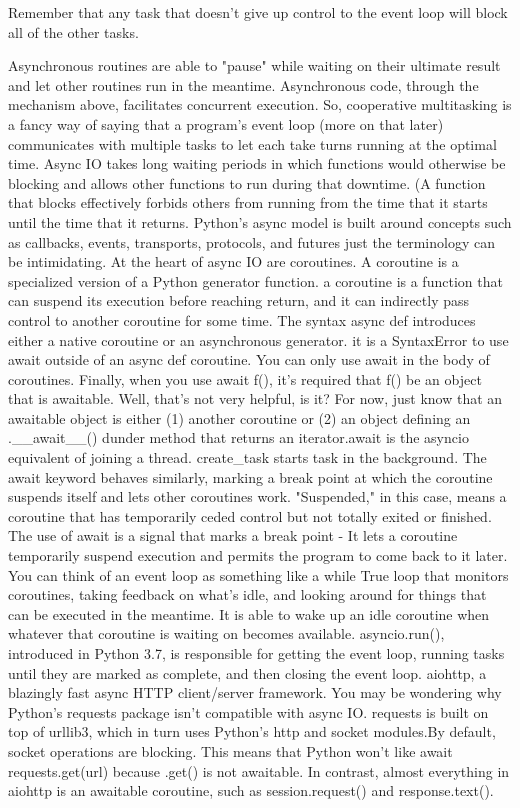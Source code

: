  Remember that any task that doesn't give up control to the event loop will block all of the other tasks.
 
 
 
Asynchronous routines are able to "pause" while waiting on their ultimate result and let other routines run in the meantime. Asynchronous code, through the mechanism above, facilitates concurrent execution. So, cooperative multitasking is a fancy way of saying that a program's event loop (more on that later) communicates with multiple tasks to let each take turns running at the optimal time. Async IO takes long waiting periods in which functions would otherwise be blocking and allows other functions to run during that downtime. (A function that blocks effectively forbids others from running from the time that it starts until the time that it returns. Python's async model is built around concepts such as callbacks, events, transports, protocols, and futures just the terminology can be intimidating.
At the heart of async IO are coroutines. A coroutine is a specialized version of a Python generator function. a coroutine is a function that can suspend its execution before reaching return, and it can indirectly pass control to another coroutine for some time. The syntax async def introduces either a native coroutine or an asynchronous generator. it is a SyntaxError to use await outside of an async def coroutine. You can only use await in the body of coroutines. Finally, when you use await f(), it's required that f() be an object that is awaitable. Well, that’s not very helpful, is it? For now, just know that an awaitable object is either (1) another coroutine or (2) an object defining an .__await__() dunder method that returns an iterator.await is the asyncio equivalent of joining a thread.  create_task starts task in the background. The await keyword behaves similarly, marking a break point at which the coroutine suspends itself and lets other coroutines work. "Suspended," in this case, means a coroutine that has temporarily ceded control but not totally exited or finished. The use of await is a signal that marks a break point - It lets a coroutine temporarily suspend execution and permits the program to come back to it later.
You can think of an event loop as something like a while True loop that monitors coroutines, taking feedback on what's idle, and looking around for things that can be executed in the meantime. It is able to wake up an idle coroutine when whatever that coroutine is waiting on becomes available. asyncio.run(), introduced in Python 3.7, is responsible for getting the event loop, running tasks until they are marked as complete, and then closing the event loop.
 aiohttp, a blazingly fast async HTTP client/server framework. You may be wondering why Python's requests package isn't compatible with async IO. requests is built on top of urllib3, which in turn uses Python's http and socket modules.By default, socket operations are blocking. This means that Python won't like await requests.get(url) because .get() is not awaitable. In contrast, almost everything in aiohttp is an awaitable coroutine, such as session.request() and response.text(). 
 
